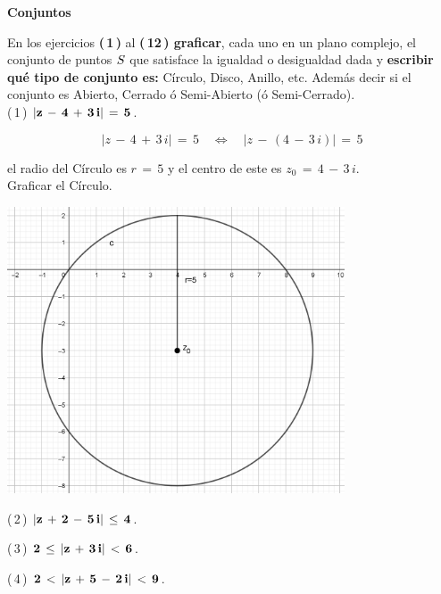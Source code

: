 \documentclass[a4paper,11pt,openany]{book}
\begin{document}
\newpage


\graphicspath{ {images/} }

\begin{center}
\textbf{Conjuntos}
\end{center}

En los ejercicios \textbf{(\,1\,)} al \textbf{(\,12\,) graficar}, cada uno en un plano complejo, el conjunto de puntos $\mathnormal{S}$ que satisface la igualdad o desigualdad dada y \textbf{escribir qué tipo de conjunto es:} Círculo, Disco, Anillo, etc. Además decir si el conjunto es Abierto, Cerrado ó Semi-Abierto (ó Semi-Cerrado).\\

\textcolor{ao(english)}{(\,1\,)} $\bf{|z\,-\,4\,+\,3\,i|\,=\,5}$.

$$|z\,-\,4\,+\,3\,i|\,=\,5 \quad\iff\quad |z\,-\,(4\,-\,3\,i)|\,=\,5$$

el radio del Círculo es $r\,=\,5$ y el centro de este es $z_{0}\,=\,4\,-\,3\,i$.\\

\textcolor{ao(english)}{} Graficar el Círculo.

\begin{center}
     \includegraphics[width=10cm]{Gra-Ej-1.png}
\end{center}

\textcolor{ao(english)}{(\,2\,)} $\bf{|z\,+\,2\,-\,5\,i|\,\leq\,4}$.

\textcolor{ao(english)}{(\,3\,)} $\bf{2\,\leq\,|z\,+\,3\,i|\,<\,6}$.

\textcolor{ao(english)}{(\,4\,)} $\bf{2\,<\,|z\,+\,5\,-\,2\,i|\,<\,9}$.
\end{document}
